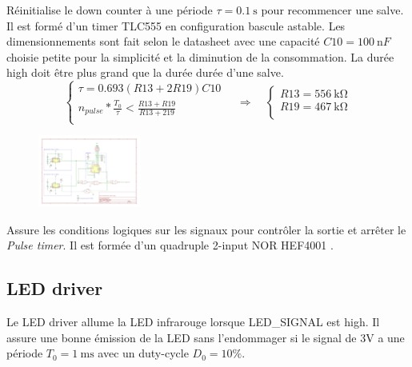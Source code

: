 \documentclass[french]{layout/Report}
\begin{document}
\begin{description}[leftmargin=!,labelwidth=3cm, labelindent=\parindent]
	\item[Burst timer]
        Réinitialise le down counter à une période $\tau = \SI{0.1}{\second}$ pour recommencer une salve.
        Il est formé d'un timer TLC555 en configuration bascule astable.
        Les dimensionnements sont fait selon le datasheet \cite{TLC555} avec une capacité $\mathit{C10} = \SI{100}{\nano F}$ choisie petite pour la simplicité et la diminution de la consommation.
        La durée high doit être plus grand que la durée durée d'une salve.
		\begin{equation*}
			\begin{cases}
				\tau = 0.693(\mathit{R13}+2\mathit{R19})\mathit{C10} \\
				n_{pulse}*\frac{T_0}{\tau} < \frac{\mathit{R13}+\mathit{R19}}{\mathit{R13}+2\mathit{19}} \\
			\end{cases}
		\quad\Rightarrow\quad
			\begin{cases}
				\mathit{R13} = \SI{556}{\kilo\ohm} \\
				\mathit{R19} = \SI{467}{\kilo\ohm} \\
			\end{cases}
		\end{equation*}

        \begin{figure}[H]
        \centering
        \includegraphics[width=0.3\textwidth]{fig/burst_timer.pdf}
        \end{figure}

	\item[Logic]
        Assure les conditions logiques sur les signaux pour contrôler la sortie et arrêter le \textit{Pulse timer}.
        Il est formée d'un quadruple 2-input NOR HEF4001 \cite{HEF4001B}.
\end{description}

\subsection{LED driver}
\label{subsec:LED_driver}
Le LED driver allume la LED infrarouge lorsque LED\_SIGNAL est high. Il assure une bonne émission de la LED sans l'endommager si le signal de 3V a une période $T_0 = \SI{1}{\milli\second}$ avec un duty-cycle $D_0 = 10\%$.
\end{document}
